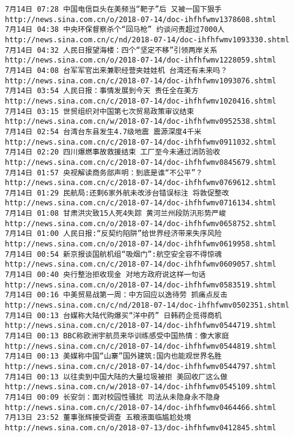 \documentclass[11pt]{article}
\begin{document}
    \begin{Verbatim}[commandchars=\\\{\}]
7月14日 07:28 中国电信巨头在美频当“靶子”后 又被一国下狠手 http://news.sina.com.cn/o/2018-07-14/doc-ihfhfwmv1378608.shtml
7月14日 04:38 中央环保督察杀个“回马枪” 约谈问责超过7000人 http://news.sina.com.cn/c/nd/2018-07-14/doc-ihfhfwmv1093330.shtml
7月14日 04:32 人民日报望海楼：四个“坚定不移”引领两岸关系 http://news.sina.com.cn/o/2018-07-14/doc-ihfhfwmv1228059.shtml
7月14日 04:08 台军军官出来兼职经营夹娃娃机 台湾还有未来吗？ http://news.sina.com.cn/c/2018-07-14/doc-ihfhfwmv1093076.shtml
7月14日 03:54 人民日报：事情发展到今天 责任全在美方 http://news.sina.com.cn/c/2018-07-14/doc-ihfhfwmv1020416.shtml
7月14日 03:15 世贸组织对中国第七次贸易政策审议结束 http://news.sina.com.cn/w/2018-07-14/doc-ihfhfwmv0952538.shtml
7月14日 02:54 台湾台东县发生4.7级地震 震源深度4千米 http://news.sina.com.cn/c/2018-07-14/doc-ihfhfwmv0911032.shtml
7月14日 02:20 四川爆燃事故救援结束 工厂至今未通过消防验收 http://news.sina.com.cn/c/2018-07-14/doc-ihfhfwmv0845679.shtml
7月14日 01:57 央视解读商务部声明：到底是谁“不公平”？ http://news.sina.com.cn/c/2018-07-14/doc-ihfhfwmv0769612.shtml
7月14日 01:29 民航局:还剩6家外航未改涉台错误标注 将敦促整改 http://news.sina.com.cn/c/2018-07-14/doc-ihfhfwmv0716134.shtml
7月14日 01:08 甘肃洪灾致15人死4失踪 黄河兰州段防汛形势严峻 http://news.sina.com.cn/o/2018-07-14/doc-ihfhfwmv0658752.shtml
7月14日 01:00 人民日报:“反契约陷阱”给世界经济带来失序风险 http://news.sina.com.cn/o/2018-07-14/doc-ihfhfwmv0619958.shtml
7月14日 00:54 新京报谈国航机组“吸烟门”:航空安全容不得惊魂 http://news.sina.com.cn/c/2018-07-14/doc-ihfhfwmv0609057.shtml
7月14日 00:40 央行整治拒收现金 对地方政府说这样一句话 http://news.sina.com.cn/o/2018-07-14/doc-ihfhfwmv0583519.shtml
7月14日 00:16 中美贸易战第一周：中方回应以逸待劳 抓痛点反击 http://news.sina.com.cn/c/nd/2018-07-14/doc-ihfhfwmv0502351.shtml
7月14日 00:13 台媒称大陆代购爆买“洋中药” 日韩药企觅得商机 http://news.sina.com.cn/c/2018-07-14/doc-ihfhfwmv0544719.shtml
7月14日 00:13 BBC称欧洲宇航员来华训练感受中国热情：像大家庭 http://news.sina.com.cn/c/2018-07-14/doc-ihfhfwmv0544819.shtml
7月14日 00:13 美媒称中国“山寨”国外建筑:国内也能观世界名胜 http://news.sina.com.cn/c/2018-07-14/doc-ihfhfwmv0544797.shtml
7月14日 00:13 以往卖到中国大陆的大量垃圾被拒 美回收厂这么做 http://news.sina.com.cn/w/2018-07-14/doc-ihfhfwmv0545109.shtml
7月14日 00:09 长安剑：面对校园性骚扰 司法从未隐身永不隐身 http://news.sina.com.cn/c/2018-07-14/doc-ihfhfwmv0464466.shtml
7月13日 23:52 董事张辉接受调查 五粮液面临尴尬处境 http://news.sina.com.cn/o/2018-07-13/doc-ihfhfwmv0412845.shtml

\end{Verbatim}
\end{document}
